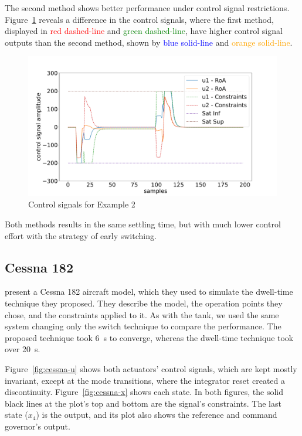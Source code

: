 The second method shows better performance under control signal restrictions.
Figure~\ref{fig:unstable-control-signals} reveals a difference in the control
signals, where the first method, displayed in \textcolor{red}{red dashed-line}
and \textcolor{green}{green dashed-line}, have higher control signal outputs
than the second method, shown by \textcolor{blue}{blue solid-line} and
\textcolor{orange}{orange solid-line}.

\begin{figure}[ht!]
  \centering
  \captionsetup{justification=centering}
  \includegraphics[width=\linewidth]{imgs/unstable_control_signal}
  \caption{Control signals for Example 2}%
  \label{fig:unstable-control-signals}
\end{figure}

Both methods results in the same settling time, but with much lower control
effort with the strategy of early switching.

\FloatBarrier

\subsection{Cessna 182}%
\label{subsec:cessna}

\textcite{franzè.lucia.ea:command} present a Cessna 182 aircraft model, which
they used to simulate the dwell-time technique they proposed. They describe the
model, the operation points they chose, and the constraints applied to it. As
with the tank, we used the same system changing only the switch technique to
compare the performance. The proposed technique took \SI{6}{\second} to
converge, whereas the dwell-time technique took over \SI{20}{\second}.

Figure~\ref{fig:cessna-u} shows both actuators' control signals, which are kept
mostly invariant, except at the mode transitions, where the integrator reset
created a discontinuity. Figure~\ref{fig:cessna-x} shows each state. In both
figures, the solid black lines at the plot's top and bottom are the signal's
constraints. The last state (\(x_{4}\)) is the output, and its plot also shows
the reference and command governor's output.

